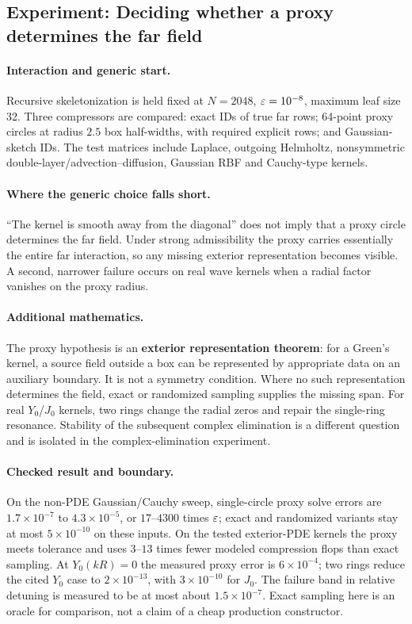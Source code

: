 \subsection{Experiment: Deciding whether a proxy determines the far field}
\label{exp:e3}
\paragraph{Interaction and generic start.} Recursive skeletonization is held fixed at $N=2048$, $\varepsilon=10^{-8}$, maximum leaf size 32. Three compressors are compared: exact IDs of true far rows; 64-point proxy circles at radius $2.5$ box half-widths, with required explicit rows; and Gaussian-sketch IDs. The test matrices include Laplace, outgoing Helmholtz, nonsymmetric double-layer/advection--diffusion, Gaussian RBF and Cauchy-type kernels.

\paragraph{Where the generic choice falls short.} ``The kernel is smooth away from the diagonal'' does not imply that a proxy circle determines the far field. Under strong admissibility the proxy carries essentially the entire far interaction, so any missing exterior representation becomes visible. A second, narrower failure occurs on real wave kernels when a radial factor vanishes on the proxy radius.

\paragraph{Additional mathematics.} The proxy hypothesis is an \textbf{exterior representation theorem}: for a Green's kernel, a source field outside a box can be represented by appropriate data on an auxiliary boundary. It is not a symmetry condition. Where no such representation determines the field, exact or randomized sampling supplies the missing span. For real $Y_0$/$J_0$ kernels, two rings change the radial zeros and repair the single-ring resonance. Stability of the subsequent complex elimination is a different question and is isolated in the complex-elimination experiment.

\paragraph{Checked result and boundary.} On the non-PDE Gaussian/Cauchy sweep, single-circle proxy solve errors are $1.7\times10^{-7}$ to $4.3\times10^{-5}$, or $17$--$4300$ times $\varepsilon$; exact and randomized variants stay at most $5\times10^{-10}$ on these inputs. On the tested exterior-PDE kernels the proxy meets tolerance and uses $3$--$13$ times fewer modeled compression flops than exact sampling. At $Y_0(kR)=0$ the measured proxy error is $6\times10^{-4}$; two rings reduce the cited $Y_0$ case to $2\times10^{-13}$, with $3\times10^{-10}$ for $J_0$. The failure band in relative detuning is measured to be at most about $1.5\times10^{-7}$. Exact sampling here is an oracle for comparison, not a claim of a cheap production constructor.

